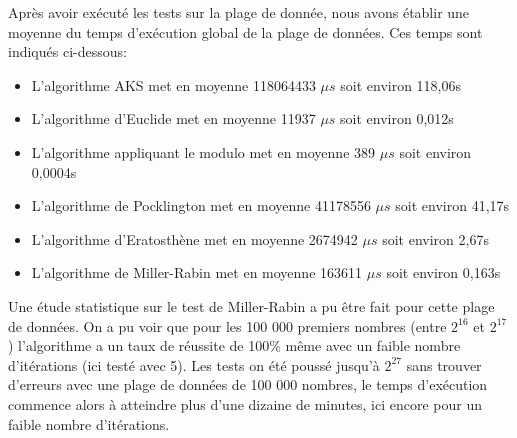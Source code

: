 Après avoir exécuté les tests sur la plage de donnée, nous avons établir une moyenne du temps d'exécution global de la plage de données. Ces temps sont indiqués ci-dessous:
\begin{itemize}
	\item L'algorithme AKS met en moyenne 118064433 $\mu s$ soit environ 118,06s
	\item L'algorithme d'Euclide met en moyenne 11937 $\mu s$ soit environ 0,012s
	\item L'algorithme appliquant le modulo met en moyenne 389 $\mu s$ soit environ 0,0004s
	\item L'algorithme de Pocklington met en moyenne 41178556 $\mu s$ soit environ 41,17s
	\item L'algorithme d'Eratosthène met en moyenne 2674942 $\mu s$ soit environ 2,67s
	\item L'algorithme de Miller-Rabin met en moyenne 163611 $\mu s$ soit environ 0,163s
\end{itemize}

 Une étude statistique sur le test de Miller-Rabin a pu être fait pour cette plage de données. On a pu voir que pour les 100 000 premiers nombres (entre $2^{16}$ et $2^{17}$) l’algorithme a un taux de réussite de 100\% même avec un faible nombre d’itérations (ici testé avec 5). Les tests on été poussé jusqu’à $2^{27}$ sans trouver d’erreurs avec une plage de données de 100 000 nombres, le temps d’exécution commence alors à atteindre plus d’une dizaine de minutes, ici encore pour un faible nombre d’itérations.\\
 

